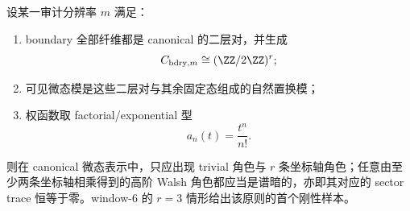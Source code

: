 \begin{conjecture}\label{conj:conclusion-window6-anchored-two-sheet-boundary-principle}
设某一审计分辨率 \(m\) 满足：
\begin{enumerate}
  \item boundary 全部纤维都是 canonical 的二层对，并生成
  \[
  C_{\mathrm{bdry},m}\cong (\ZZ/2\ZZ)^r;
  \]
  \item 可见微态模是这些二层对与其余固定态组成的自然置换模；
  \item 权函数取 factorial/exponential 型
  \[
  a_n(t)=\frac{t^n}{n!}.
  \]
\end{enumerate}
则在 canonical 微态表示中，只应出现 trivial 角色与 \(r\) 条坐标轴角色；任意由至少两条坐标轴相乘得到的高阶 Walsh 角色都应当是谱暗的，亦即其对应的 sector trace 恒等于零。window-\(6\) 的 \(r=3\) 情形给出该原则的首个刚性样本。
\end{conjecture}
